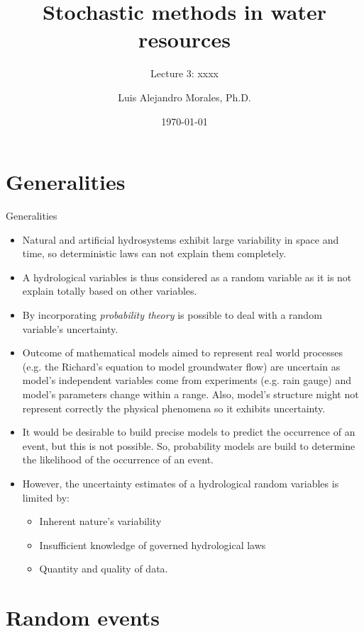 \documentclass[8pt]{beamer}
\title{Stochastic methods in water resources}
\subtitle{Lecture 3: xxxx}
\author{Luis Alejandro Morales, Ph.D.}
\institute{Universidad Nacional de Colombia} %
\date{\today}
\begin{document}
\begin{frame}
    \titlepage
\end{frame}

\section{Generalities}
\begin{frame}{Generalities}
    \begin{itemize}
        \item Natural and artificial hydrosystems exhibit large variability in space and time, so deterministic laws can not explain them completely.
        \item A hydrological variables is thus considered as a \alert{random variable} as it is not explain totally based on other variables. 
        \item By incorporating \emph{probability theory} is possible to deal with a random variable's uncertainty. 
        \item Outcome of mathematical models aimed to represent real world processes (e.g. the Richard's equation to model groundwater flow) are uncertain as  model's independent variables come from experiments (e.g. rain gauge) and model's parameters change within a range. Also,  model's structure might not represent correctly the physical phenomena so it exhibits uncertainty. 
        \item It would be desirable to build precise models to predict the occurrence of an event, but this is not possible. So, probability models are build to determine the likelihood of the occurrence of an event. 
        \item However, the uncertainty estimates of a hydrological random variables is limited by:
            \begin{itemize}
                \item Inherent nature's variability
                \item Insufficient knowledge of governed hydrological laws
                \item Quantity and quality of data.
            \end{itemize}
    \end{itemize}
\end{frame}

\section{Random events}
\end{document}
